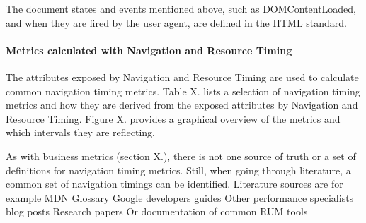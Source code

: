 



The document states and events mentioned above, such as DOMContentLoaded, and when they are fired by the user agent, are defined in the HTML standard.












\paragraph{Metrics calculated with Navigation and Resource Timing}

The attributes exposed by Navigation and Resource Timing are used to calculate common navigation timing metrics.
Table X. lists a selection of navigation timing metrics and how they are derived from the exposed attributes by Navigation and Resource Timing.
Figure X. provides a graphical overview of the metrics and which intervals they are reflecting.

As with business metrics (section X.), there is not one source of truth or a set of definitions for navigation timing metrics.
Still, when going through literature, a common set of navigation timings can be identified.
Literature sources are for example MDN Glossary %
Google developers guides %
Other performance specialists blog posts %
Research papers %
Or documentation of common RUM tools %

